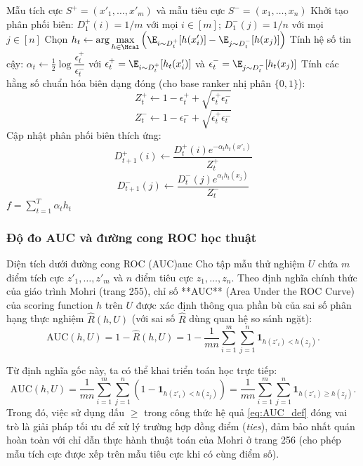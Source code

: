 \begin{algorithm}[H]
\caption{BipartiteRankBoost}
\label{alg:bipartite_rankboost}
\begin{algorithmic}[1]
\REQUIRE Mẫu tích cực $S^+ = (x'_1, \ldots, x'_m)$ và mẫu tiêu cực $S^- = (x_1, \ldots, x_n)$
\STATE Khởi tạo phân phối biên: $D^+_1(i) = 1/m$ với mọi $i \in [m]$; $D^-_1(j) = 1/n$ với mọi $j \in [n]$
    \STATE Chọn $h_t \leftarrow \displaystyle\arg\max_{h \in \Hcal} \left( \E_{i \sim D^+_t}[h(x'_i)] - \E_{j \sim D^-_t}[h(x_j)] \right)$
    \STATE Tính hệ số tin cậy: $\alpha_t \leftarrow \frac{1}{2}\log\dfrac{\epsilon^+_t}{\epsilon^-_t}$ \quad với $\epsilon^+_t = \E_{i \sim D^+_t}[h_t(x'_i)]$ và $\epsilon^-_t = \E_{j \sim D^-_t}[h_t(x_j)]$
    \STATE Tính các hằng số chuẩn hóa biên dạng đóng (cho base ranker nhị phân $\{0,1\}$):
           $$Z^+_t \leftarrow 1 - \epsilon^+_t + \sqrt{\epsilon^+_t \epsilon^-_t}$$
           $$Z^-_t \leftarrow 1 - \epsilon^-_t + \sqrt{\epsilon^+_t \epsilon^-_t}$$
    \STATE Cập nhật phân phối biên thích ứng:
           $$D^+_{t+1}(i) \leftarrow \frac{D^+_t(i) e^{-\alpha_t h_t(x'_i)}}{Z^+_t}$$
           $$D^-_{t+1}(j) \leftarrow \frac{D^-_t(j) e^{\alpha_t h_t(x_j)}}{Z^-_t}$$
\ENDFOR
\RETURN $f = \sum_{t=1}^T \alpha_t h_t$
\end{algorithmic}
\end{algorithm}

\subsubsection{Độ đo AUC và đường cong ROC học thuật}

\begin{definition}{Diện tích dưới đường cong ROC (AUC)}{auc}
Cho tập mẫu thử nghiệm $U$ chứa $m$ điểm tích cực $z'_1, \ldots, z'_m$ và $n$ điểm tiêu cực $z_1, \ldots, z_n$. Theo định nghĩa chính thức của giáo trình Mohri (trang 255), chỉ số **AUC** (Area Under the ROC Curve) của scoring function $h$ trên $U$ được xác định thông qua phần bù của sai số phân hạng thực nghiệm $\hat{R}(h, U)$ (với sai số $\hat{R}$ dùng quan hệ so sánh ngặt):
\begin{equation}
    \mathrm{AUC}(h, U) = 1 - \hat{R}(h, U) = 1 - \frac{1}{mn} \sum_{i=1}^m \sum_{j=1}^n \mathbf{1}_{h(z'_i) < h(z_j)}.
    \label{eq:AUC_official}
\end{equation}

Từ định nghĩa gốc này, ta có thể khai triển toán học trực tiếp:
\begin{equation}
    \mathrm{AUC}(h, U) = \frac{1}{mn} \sum_{i=1}^m \sum_{j=1}^n \left( 1 - \mathbf{1}_{h(z'_i) < h(z_j)} \right) = \frac{1}{mn} \sum_{i=1}^m \sum_{j=1}^n \mathbf{1}_{h(z'_i) \geq h(z_j)}.
    \label{eq:AUC_def}
\end{equation}
Trong đó, việc sử dụng dấu $\geq$ trong công thức hệ quả \eqref{eq:AUC_def} đóng vai trò là giải pháp tối ưu để xử lý trường hợp đồng điểm (\textit{ties}), đảm bảo nhất quán hoàn toàn với chỉ dẫn thực hành thuật toán của Mohri ở trang 256 (cho phép mẫu tích cực được xếp trên mẫu tiêu cực khi có cùng điểm số).
\end{definition}

